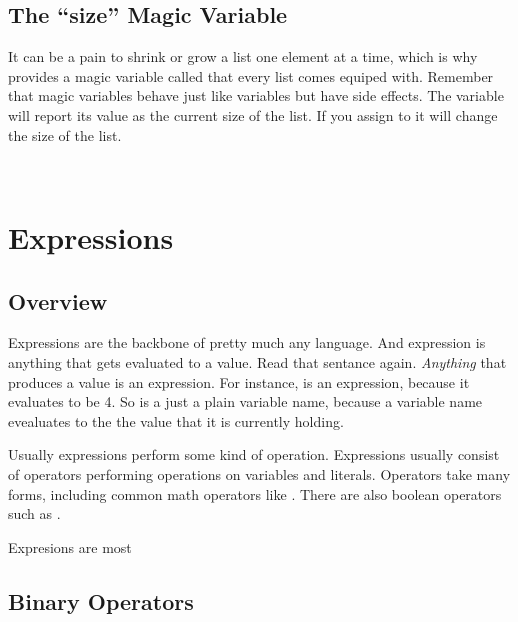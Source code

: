 \documentclass{book}
\begin{document}
\subsection{The ``size'' Magic Variable}

It can be a pain to shrink or grow a list one element at a time, which is why \SSquared provides a magic variable called  that every list comes equiped with.  Remember that magic variables behave just like variables but have side effects.  The  variable will report its value as the current size of the list.  If you assign to  it will change the size of the list.

\begin{SSCodeBox}
\scitea{, }
\scitea{, }
\scitea{, }
\scitea{, }
\scitea{, }
\scitea{);} \\
\scitea{; }
\end{SSCodeBox}


\section{Expressions}

\subsection{Overview}

Expressions are the backbone of pretty much any language.  And expression is anything that gets evaluated to a value.  Read that sentance again.  \emph{Anything} that produces a value is an expression.  For instance,  is an expression, because it evaluates to be 4.  So is a just a plain variable name, because a variable name evealuates to the the value that it is currently holding.  

Usually expressions perform some kind of operation.  Expressions usually consist of operators performing operations on variables and literals.  Operators take many forms, including common math operators like \SSCode{+, -, *, /}.  There are also boolean operators such as .

Expresions are most 

\subsection{Binary Operators}
\end{document}
